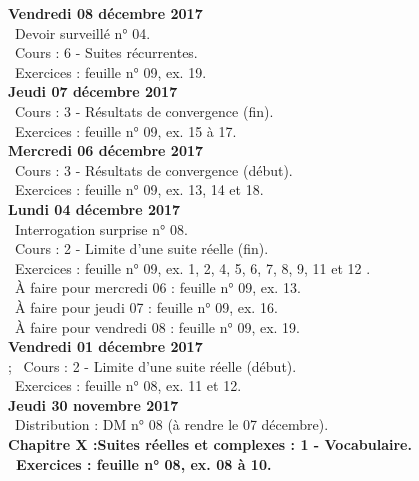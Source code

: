 \documentclass[12pt,a4paper]{article}
\begin{document}
\noindent\textbf{Vendredi 08 décembre 2017}\\
\bu\ Devoir surveillé n° 04.\\
\bu\ Cours : 6 - Suites récurrentes.\\
\bu\ Exercices : feuille n° 09, ex. 19.\vspace{.4cm}\\

\noindent\textbf{Jeudi 07 décembre 2017}\\
\bu\ Cours : 3 - Résultats de convergence (fin).\\
\bu\ Exercices : feuille n° 09, ex. 15 à 17.\vspace{.4cm}\\

\noindent\textbf{\bf Mercredi 06 décembre 2017}\\
\bu\ Cours : 3 - Résultats de convergence (début).\\
\bu\ Exercices : feuille n° 09, ex. 13, 14 et 18.\vspace{.4cm}\\

\noindent\textbf{Lundi 04 décembre 2017}\\
\bu\ Interrogation surprise n° 08.\\
\bu\ Cours : 2 - Limite d'une suite réelle (fin).\\
\bu\ Exercices : feuille n° 09, ex. 1, 2, 4, 5, 6, 7, 8, 9, 11 et 12 .\\
\bu\ À faire pour mercredi 06 : feuille n° 09, ex. 13.\\
\bu\ À faire pour jeudi 07 : feuille n° 09, ex. 16.\\
\bu\ À faire pour vendredi 08 : feuille n° 09, ex. 19.\vspace{.4cm}\\

\noindent\textbf{Vendredi 01 décembre 2017}\\ ; 
\bu\ Cours : 2 - Limite d'une suite réelle (début).\\
\bu\ Exercices : feuille n° 08, ex. 11 et 12.\vspace{.4cm}\\

\noindent\textbf{Jeudi 30 novembre 2017}\\
\bu\ Distribution : DM n° 08 (à rendre le 07 décembre).\\
\bf Chapitre X :\rm Suites réelles et complexes : 1 - Vocabulaire.\\
\bu\ Exercices : feuille n° 08, ex. 08 à 10.\vspace{.4cm}\\
\end{document}
